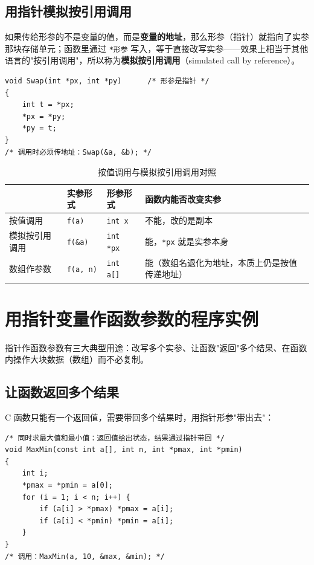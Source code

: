 \subsection{用指针模拟按引用调用}
如果传给形参的不是变量的值，而是\textbf{变量的地址}，那么形参（指针）就指向了实参那块存储单元；函数里通过 \texttt{*形参} 写入，等于直接改写实参——效果上相当于其他语言的"按引用调用"，所以称为\textbf{模拟按引用调用}（simulated call by reference）。
\begin{lstlisting}
void Swap(int *px, int *py)      /* 形参是指针 */
{
    int t = *px;
    *px = *py;
    *py = t;
}
/* 调用时必须传地址：Swap(&a, &b); */
\end{lstlisting}

\begin{table}[htbp]
\centering
\caption{按值调用与模拟按引用调用对照}
\footnotesize
\begin{tabularx}{\textwidth}{@{}p{2.4cm}p{3.1cm}p{3.4cm}X@{}}
\toprule
 & 实参形式 & 形参形式 & 函数内能否改变实参 \\
\midrule
按值调用 & \texttt{f(a)} & \texttt{int x} & 不能，改的是副本 \\
模拟按引用调用 & \texttt{f(\&a)} & \texttt{int *px} & 能，\texttt{*px} 就是实参本身 \\
数组作参数 & \texttt{f(a, n)} & \texttt{int a[]} & 能（数组名退化为地址，本质上仍是按值传递地址） \\
\bottomrule
\end{tabularx}
\end{table}


\section{用指针变量作函数参数的程序实例}
指针作函数参数有三大典型用途：改写多个实参、让函数"返回"多个结果、在函数内操作大块数据（数组）而不必复制。

\subsection{让函数返回多个结果}
C 函数只能有一个返回值，需要带回多个结果时，用指针形参"带出去"：
\begin{lstlisting}
/* 同时求最大值和最小值：返回值给出状态，结果通过指针带回 */
void MaxMin(const int a[], int n, int *pmax, int *pmin)
{
    int i;
    *pmax = *pmin = a[0];
    for (i = 1; i < n; i++) {
        if (a[i] > *pmax) *pmax = a[i];
        if (a[i] < *pmin) *pmin = a[i];
    }
}
/* 调用：MaxMin(a, 10, &max, &min); */
\end{lstlisting}

